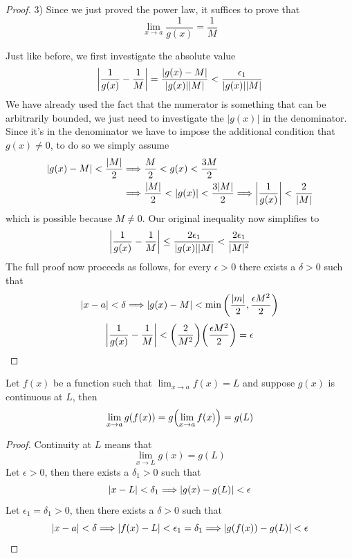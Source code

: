 \begin{proof}
	3) Since we just proved the power law, it suffices to prove that
	\[ \lim_{x \to a} \frac{1}{g(x)} = \frac{1}{M} \]
	
	Just like before, we first investigate the absolute value
	\[ \abs{\frac{1}{g(x)} - \frac{1}{M}} = \frac{|g(x) - M|}{|g(x)||M|} < \frac{\epsilon_1}{|g(x)||M|} \]
	We have already used the fact that the numerator is something that can be arbitrarily bounded, we just need to investigate the $|g(x)|$ in the denominator. Since it's in the denominator we have to impose the additional condition that $g(x) \neq 0$, to do so we simply assume
	\begin{align*}
		|g(x) - M| < \frac{|M|}{2} &\Longrightarrow \frac{M}{2} < g(x) < \frac{3M}{2} \\
		&\Longrightarrow \frac{|M|}{2} < |g(x)| < \frac{3|M|}{2} \Longrightarrow \abs{\frac{1}{g(x)}} < \frac{2}{|M|}
	\end{align*}
	which is possible because $M \neq 0$. Our original inequality now simplifies to
	\[ \abs{\frac{1}{g(x)} - \frac{1}{M}} \leq \frac{2\epsilon_1}{|g(x)||M|} < \frac{2\epsilon_1}{|M|^2} \]
	The full proof now proceeds as follows, for every $\epsilon > 0$ there exists a $\delta > 0$ such that
	\[ |x - a| < \delta \Longrightarrow |g(x) - M| < \min\qty(\frac{|m|}{2}, \frac{\epsilon M^2}{2}) \]
	\[ \abs{\frac{1}{g(x)} - \frac{1}{M}} < \qty(\frac{2}{M^2}) \qty(\frac{\epsilon M^2}{2}) = \epsilon \]
	
\end{proof}

\begin{theorem}
	Let $f(x)$ be a function such that $\lim_{x \to a} f(x) = L$ and suppose $g(x)$ is continuous at $L$, then
	\[ \lim_{x \to a} g(f(x)) = g\qty(\lim_{x \to a} f(x)) = g(L) \]
\end{theorem}
\begin{proof}
	Continuity at $L$ means that
	\[ \lim_{x \to L} g(x) = g(L) \]
	Let $\epsilon > 0$, then there exists a $\delta_1 > 0$ such that
	\[ |x - L| < \delta_1 \Longrightarrow |g(x) - g(L)| < \epsilon \]
	Let $\epsilon_1 = \delta_1 > 0$, then there exists a $\delta > 0$ such that
	\[ |x - a| < \delta \Longrightarrow |f(x) - L| < \epsilon_1 = \delta_1 \Longrightarrow |g(f(x)) - g(L)| < \epsilon \]
\end{proof}